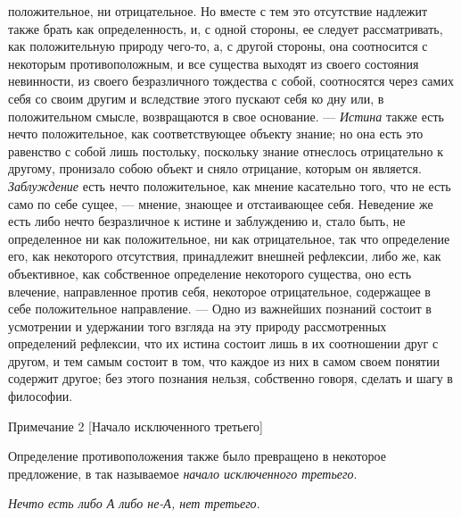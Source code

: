 положительное, ни отрицательное. Но вместе с тем это отсутствие надлежит
также брать как определенность, и, с одной стороны, ее следует
рассматривать, как положительную природу чего-то, а, с другой стороны, она
соотносится с некоторым противоположным, и все существа выходят из своего
состояния невинности, из своего безразличного тождества с собой,
соотносятся через самих себя со своим другим и вследствие этого пускают
себя ко дну или, в положительном смысле, возвращаются в свое основание. —
{\em Истина} также есть нечто положительное, как
соответствующее объекту знание; но она есть это равенство с собой лишь
постольку, поскольку знание отнеслось отрицательно к другому, пронизало
собою объект и сняло отрицание, которым он является.
{\em Заблуждение} есть нечто положительное, как мнение
касательно того, что не есть само по себе сущее, — мнение, знающее и
отстаивающее себя. Неведение же есть либо нечто безразличное к истине и
заблуждению и, стало быть, не определенное ни как положительное, ни как
отрицательное, так что определение его, как некоторого отсутствия,
принадлежит внешней рефлексии, либо же, как объективное, как собственное
определение некоторого существа, оно есть влечение, направленное против
себя, некоторое отрицательное, содержащее в себе положительное направление.
— Одно из важнейших познаний состоит в усмотрении и удержании того взгляда
на эту природу рассмотренных определений рефлексии, что их истина состоит
лишь в их соотношении друг с другом, и тем самым состоит в том, что каждое
из них в самом своем понятии содержит другое; без этого познания нельзя,
собственно говоря, сделать и шагу в философии.

{\centering
Примечание 2
[Начало исключенного третьего]
\par}

Определение противоположения также было превращено в некоторое предложение,
в так называемое {\em начало исключенного третьего}.

{\em Нечто есть либо А либо не-А, нет третьего}.

